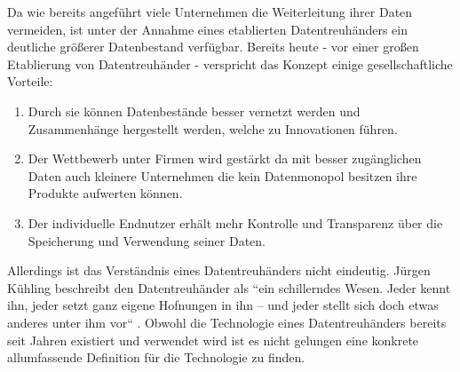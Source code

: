 \documentclass[11pt,a4paper]{scrreprt}
\begin{document}
Da wie bereits angeführt viele Unternehmen die Weiterleitung ihrer Daten vermeiden, ist unter der Annahme eines etablierten Datentreuhänders ein deutliche größerer Datenbestand verfügbar. Bereits heute - vor einer großen Etablierung von Datentreuhänder - verspricht das Konzept einige gesellschaftliche Vorteile: \cite{dt-richter2020ddvtalk}
\begin{enumerate}
    \item Durch sie können Datenbestände besser vernetzt werden und Zusammenhänge hergestellt werden, welche zu Innovationen führen.
    \item Der Wettbewerb unter Firmen wird gestärkt da mit besser zugänglichen Daten auch kleinere Unternehmen die kein Datenmonopol besitzen ihre Produkte aufwerten können.
    \item Der individuelle Endnutzer erhält mehr Kontrolle und Transparenz über die Speicherung und Verwendung seiner Daten.
\end{enumerate}

Allerdings ist das Verständnis eines Datentreuhänders nicht eindeutig. Jürgen Kühling beschreibt den Datentreuhänder als ``ein schillerndes Wesen. Jeder kennt ihn, jeder setzt ganz eigene Hofnungen in ihn – und jeder stellt sich doch etwas anderes unter ihm vor`` \cite{dt-kuhling2021datentreuhander}. Obwohl die Technologie eines Datentreuhänders bereits seit Jahren existiert und verwendet wird \cite{dt-hardinges2018data} ist es nicht gelungen eine konkrete allumfassende Definition für die Technologie zu finden.

\end{document}
